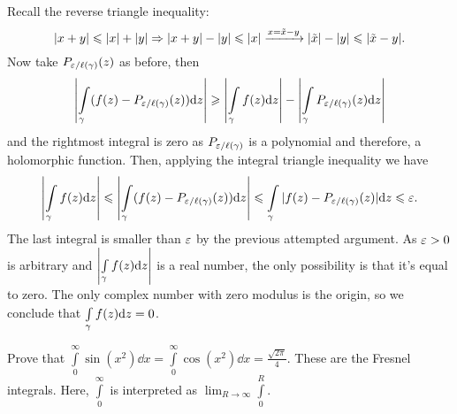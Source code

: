 \documentclass[12pt]{memoir}
\begin{document}
\begin{ptcbr}
Recall the reverse triangle inequality: 
$$|x+y|\leqslant |x|+|y|\Rightarrow |x+y|-|y|\leqslant |x|\xrightarrow[]{x=\tilde{x}-y}|\tilde{x}|-|y|\leqslant|\tilde{x}-y|.$$
Now take $P_{\varepsilon/\ell(\gamma)}(z)$ as before, then 
$$\left|\int\limits_\gamma (f(z)-P_{\varepsilon/\ell(\gamma)}(z))\dd z\right|\geqslant\left|\int\limits_\gamma f(z)\dd z\right|-\left|\int\limits_\gamma P_{\varepsilon/\ell(\gamma)}(z)\dd z\right| $$
and the rightmost integral is zero as $P_{\varepsilon/\ell(\gamma)}$ is a polynomial and therefore, a holomorphic function. Then, applying the integral triangle inequality we have 
$$\left|\int\limits_\gamma f(z)\dd z\right|\leqslant\left|\int\limits_\gamma (f(z)-P_{\varepsilon/\ell(\gamma)}(z))\dd z\right|\leqslant\int\limits_\gamma |f(z)-P_{\varepsilon/\ell(\gamma)}(z)|\dd z\leqslant\varepsilon.$$
The last integral is smaller than $\varepsilon$ by the previous attempted argument. As $\varepsilon>0$ is arbitrary and $\left|\int\limits_\gamma f(z)\dd z\right|$ is a real number, the only possibility is that it's equal to zero. The only complex number with zero modulus is the origin, so we conclude that $\int\limits_{\gamma}^{}f(z)\dd z=0$.
\end{ptcbr}

\begin{Ej}
Prove that $\int\limits_0^{\infty}\sin(x^2)\dd x=\int\limits_0^{\infty}\cos(x^2)\dd x=\frac{\sqrt{2\pi}}{4}$. These are the Fresnel integrals. Here, $\int\limits_0^{\infty}$ is interpreted as $\lim_{R\to\infty}\int\limits_0^{R}$.
\end{Ej}
\end{document}
